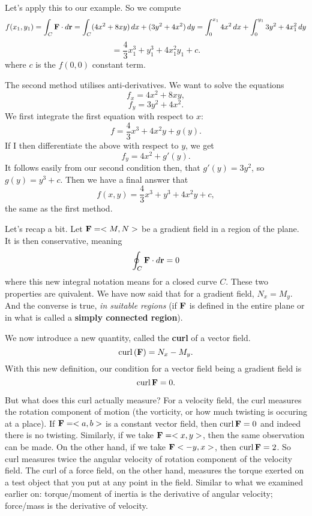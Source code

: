 Let's apply this to our example. So we compute
\[ f(x_1,y_1) = \int_C \boldsymbol{\mathbf{F}} \cdot d\boldsymbol{\mathbf{r}} = \int_C (4x^2+8xy)\,dx + (3y^2 +4x^2)\,dy = \int_0^{x_1} 4x^2 \, dx + \int_0^{y_1} 3y^2 + 4x_1^2\, dy \]
\[ = \frac 43x_1^3 + y_1^3 + 4x_1^2y_1 + c. \]
where $c$ is the $f(0,0)$ constant term.

\item The second method utilises anti-derivatives. We want to solve the equations
\[ f_x = 4x^2 + 8xy, \]
\[ f_y = 3y^2 + 4x^2. \]
We first integrate the first equation with respect to $x$:
\[ f = \frac 43 x^3 + 4x^2y + g(y). \]
If I then differentiate the above with respect to $y$, we get
\[ f_y = 4x^2 + g'(y). \]
It follows easily from our second condition then, that $g'(y) = 3y^2$, so $g(y) = y^3 + c$. Then we have a final answer that
\[ f(x,y) = \frac 43x^3 + y^3 + 4x^2y + c, \]
the same as the first method.
\een
\eex

Let's recap a bit. Let $\boldsymbol{\mathbf{F}}=<M,N>$ be a gradient field in a region of the plane. It is then conservative, meaning
\[ \oint_C \boldsymbol{\mathbf{F}} \cdot d\boldsymbol{\mathbf{r}} = 0 \]
where this new integral notation means for a closed curve $C$. These two properties are quivalent. We have now said that for a gradient field, $N_x = M_y$. And the converse is true, \textit{in suitable regions} (if $\boldsymbol{\mathbf{F}}$ is defined in the entire plane or in what is called a \textbf{simply connected region}). 

We now introduce a new quantity, called the \textbf{curl} of a vector field. 
\bdf
\[ \mathrm{curl}\,(\boldsymbol{\mathbf{F}}) = N_x - M_y. \]
\edf
With this new definition, our condition for a vector field being a gradient field is 
\[ \mathrm{curl}\, \boldsymbol{\mathbf{F}} = 0. \]

But what does this curl actually measure? For a velocity field, the curl measures the rotation component of motion (the vorticity, or how much twisting is occuring at a place). If $\boldsymbol{\mathbf{F}}=<a,b>$ is a constant vector field, then $\mathrm{curl}\, \boldsymbol{\mathbf{F}} = 0$ and indeed there is no twisting. Similarly, if we take $\boldsymbol{\mathbf{F}} = <x,y>$, then the same observation can be made. On the other hand, if we take $\boldsymbol{\mathbf{F}} <-y,x>$, then $\mathrm{curl}\, \boldsymbol{\mathbf{F}} = 2$. So curl measures twice the angular velocity of rotation component of the velocity field. The curl of a force field, on the other hand, measures the torque exerted on a test object that you put at any point in the field. Similar to what we examined earlier on: torque/moment of inertia is the derivative of angular velocity; force/mass is the derivative of velocity.  